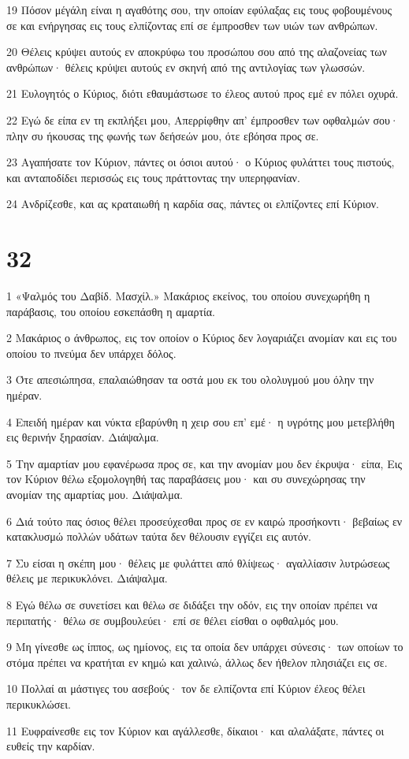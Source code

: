 \par 19 Πόσον μέγάλη είναι η αγαθότης σου, την οποίαν εφύλαξας εις τους φοβουμένους σε και ενήργησας εις τους ελπίζοντας επί σε έμπροσθεν των υιών των ανθρώπων.
\par 20 Θέλεις κρύψει αυτούς εν αποκρύφω του προσώπου σου από της αλαζονείας των ανθρώπων· θέλεις κρύψει αυτούς εν σκηνή από της αντιλογίας των γλωσσών.
\par 21 Ευλογητός ο Κύριος, διότι εθαυμάστωσε το έλεος αυτού προς εμέ εν πόλει οχυρά.
\par 22 Εγώ δε είπα εν τη εκπλήξει μου, Απερρίφθην απ' έμπροσθεν των οφθαλμών σου· πλην συ ήκουσας της φωνής των δεήσεών μου, ότε εβόησα προς σε.
\par 23 Αγαπήσατε τον Κύριον, πάντες οι όσιοι αυτού· ο Κύριος φυλάττει τους πιστούς, και ανταποδίδει περισσώς εις τους πράττοντας την υπερηφανίαν.
\par 24 Ανδρίζεσθε, και ας κραταιωθή η καρδία σας, πάντες οι ελπίζοντες επί Κύριον.

\chapter{32}

\par 1 «Ψαλμός του Δαβίδ. Μασχίλ.» Μακάριος εκείνος, του οποίου συνεχωρήθη η παράβασις, του οποίου εσκεπάσθη η αμαρτία.
\par 2 Μακάριος ο άνθρωπος, εις τον οποίον ο Κύριος δεν λογαριάζει ανομίαν και εις του οποίου το πνεύμα δεν υπάρχει δόλος.
\par 3 Ότε απεσιώπησα, επαλαιώθησαν τα οστά μου εκ του ολολυγμού μου όλην την ημέραν.
\par 4 Επειδή ημέραν και νύκτα εβαρύνθη η χειρ σου επ' εμέ· η υγρότης μου μετεβλήθη εις θερινήν ξηρασίαν. Διάψαλμα.
\par 5 Την αμαρτίαν μου εφανέρωσα προς σε, και την ανομίαν μου δεν έκρυψα· είπα, Εις τον Κύριον θέλω εξομολογηθή τας παραβάσεις μου· και συ συνεχώρησας την ανομίαν της αμαρτίας μου. Διάψαλμα.
\par 6 Διά τούτο πας όσιος θέλει προσεύχεσθαι προς σε εν καιρώ προσήκοντι· βεβαίως εν κατακλυσμώ πολλών υδάτων ταύτα δεν θέλουσιν εγγίζει εις αυτόν.
\par 7 Συ είσαι η σκέπη μου· θέλεις με φυλάττει από θλίψεως· αγαλλίασιν λυτρώσεως θέλεις με περικυκλόνει. Διάψαλμα.
\par 8 Εγώ θέλω σε συνετίσει και θέλω σε διδάξει την οδόν, εις την οποίαν πρέπει να περιπατής· θέλω σε συμβουλεύει· επί σε θέλει είσθαι ο οφθαλμός μου.
\par 9 Μη γίνεσθε ως ίππος, ως ημίονος, εις τα οποία δεν υπάρχει σύνεσις· των οποίων το στόμα πρέπει να κρατήται εν κημώ και χαλινώ, άλλως δεν ήθελον πλησιάζει εις σε.
\par 10 Πολλαί αι μάστιγες του ασεβούς· τον δε ελπίζοντα επί Κύριον έλεος θέλει περικυκλώσει.
\par 11 Ευφραίνεσθε εις τον Κύριον και αγάλλεσθε, δίκαιοι· και αλαλάξατε, πάντες οι ευθείς την καρδίαν.

